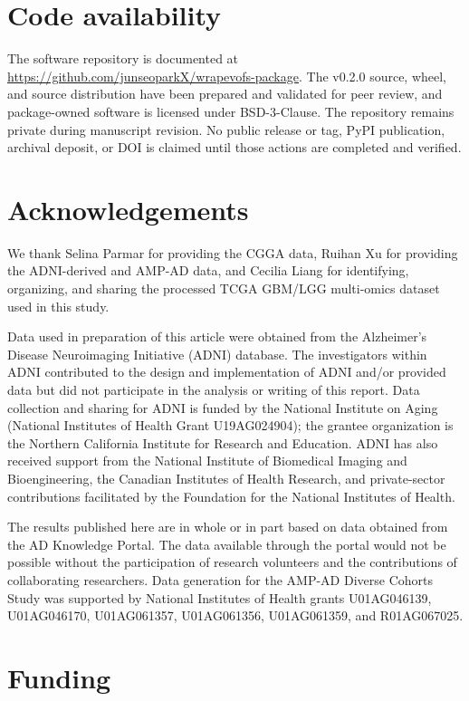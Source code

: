 \FloatBarrier
\section{Code availability}

The software repository is documented at \url{https://github.com/junseoparkX/wrapevofs-package}. The v0.2.0 source, wheel, and source distribution have been prepared and validated for peer review, and package-owned software is licensed under BSD-3-Clause. The repository remains private during manuscript revision. No public release or tag, PyPI publication, archival deposit, or DOI is claimed until those actions are completed and verified.

\FloatBarrier
\section{Acknowledgements}

We thank Selina Parmar for providing the CGGA data, Ruihan Xu for providing the ADNI-derived and AMP-AD data, and Cecilia Liang for identifying, organizing, and sharing the processed TCGA GBM/LGG multi-omics dataset used in this study.

Data used in preparation of this article were obtained from the Alzheimer's Disease Neuroimaging Initiative (ADNI) database. The investigators within ADNI contributed to the design and implementation of ADNI and/or provided data but did not participate in the analysis or writing of this report. Data collection and sharing for ADNI is funded by the National Institute on Aging (National Institutes of Health Grant U19AG024904); the grantee organization is the Northern California Institute for Research and Education. ADNI has also received support from the National Institute of Biomedical Imaging and Bioengineering, the Canadian Institutes of Health Research, and private-sector contributions facilitated by the Foundation for the National Institutes of Health.

The results published here are in whole or in part based on data obtained from the AD Knowledge Portal. The data available through the portal would not be possible without the participation of research volunteers and the contributions of collaborating researchers. Data generation for the AMP-AD Diverse Cohorts Study was supported by National Institutes of Health grants U01AG046139, U01AG046170, U01AG061357, U01AG061356, U01AG061359, and R01AG067025.

\FloatBarrier
\section{Funding}

